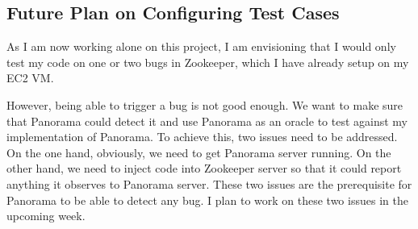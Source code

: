 \subsection{Future Plan on Configuring Test Cases}
As I am now working alone on this project, I am envisioning that I would only test my code on one or two bugs in Zookeeper, which I have already setup on my EC2 VM.

However, being able to trigger a bug is not good enough. We want to make sure that Panorama could detect it and use Panorama as an oracle to test against my implementation of Panorama. To achieve this, two issues need to be addressed. On the one hand, obviously, we need to get Panorama server running. On the other hand, we need to inject code into Zookeeper server so that it could report anything it observes to Panorama server. These two issues are the prerequisite for Panorama to be able to detect any bug. I plan to work on these two issues in the upcoming week.